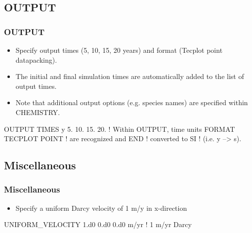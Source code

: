 \documentclass{beamer}
\newcommand\redcomment[1]{{{\color{red} #1}}}
\newcommand\bluecomment[1]{{{\color{blue} #1}}}
\newcommand\greencomment[1]{{{\color{green} #1}}}
\begin{document}
\subsection{OUTPUT}

\begin{frame}[fragile]\frametitle{OUTPUT}

\begin{itemize}
\item Specify output times (5, 10, 15, 20 years) and format (Tecplot point datapacking).
\item The initial and final simulation times are automatically added to the list of output times.
\item Note that additional output options (e.g. species names) are specified within CHEMISTRY.
\end{itemize}


\begin{semiverbatim}

OUTPUT
  TIMES \redcomment{y} 5. 10. 15. 20.  \bluecomment{! Within OUTPUT, time units}
  FORMAT TECPLOT POINT    \bluecomment{! are recognized and}
END                       \bluecomment{! converted to SI}
                          \bluecomment{! (i.e. \redcomment{y} --> \greencomment{s}).}
\end{semiverbatim}

\end{frame}

\subsection{Miscellaneous}

\begin{frame}[fragile]\frametitle{Miscellaneous}

\begin{itemize}
\item Specify a uniform Darcy velocity of 1 m/y in x-direction
\end{itemize}


\begin{semiverbatim}

UNIFORM_VELOCITY 1.d0 0.d0 0.d0 m/yr  \bluecomment{! 1 m/yr Darcy}
\end{semiverbatim}

\end{frame}
\end{document}
